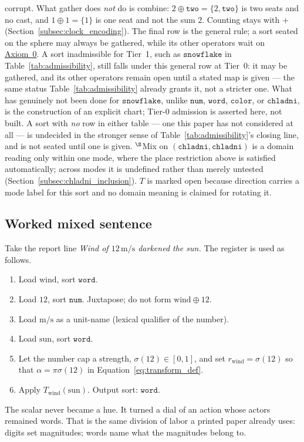 \documentclass[12pt, a4paper]{article}
\begin{document}
\begin{table}[h]
{corrupt. What gather does \emph{not} do is combine: $2\oplus
\texttt{two}=\{2,\texttt{two}\}$ is two seats and no cast, and
$1\oplus 1=\{1\}$ is one seat and not the sum $2$. Counting stays with
$+$ (Section~\ref{subsec:clock_encoding}). The final row is the
general rule; a sort seated on the sphere may always be gathered, while
its other operators wait on
\hyperref[subsec:axiom0_admissibility]{Axiom~0}. A sort inadmissible for
Tier~1, such as $\mathtt{snowflake}$ in
Table~\ref{tab:admissibility}, still falls under this general row at
Tier~0: it may be gathered, and its other operators remain open until
a stated map is given --- the same status Table~\ref{tab:admissibility}
already grants it, not a stricter one. What has genuinely not been
done for $\mathtt{snowflake}$, unlike $\mathtt{num}$, $\mathtt{word}$,
$\mathtt{color}$, or $\mathtt{chladni}$, is the construction of an
explicit chart; Tier-0 admission is asserted here, not built. A sort
with \emph{no} row in either table --- one this paper has not
considered at all --- is undecided in the stronger sense of
Table~\ref{tab:admissibility}'s closing line, and is not seated until
one is given.
$^{\S}$Mix on $(\mathtt{chladni},\mathtt{chladni})$ is a domain
reading only within one mode, where the place restriction above is
satisfied automatically; across modes it is undefined rather than
merely untested (Section~\ref{subsec:chladni_inclusion}). $T$ is
marked open because direction carries a mode label for this sort and
no domain meaning is claimed for rotating it.}
\label{tab:type_table}
\end{table}

\subsection{Worked mixed sentence}
\label{subsec:mixed_sentence}
Take the report line \emph{Wind of $12\,\mathrm{m/s}$ darkened the sun.}
The register is used as follows.

\begin{enumerate}
    \item Load $\mathrm{wind}$, sort $\mathtt{word}$.
    \item Load $12$, sort $\mathtt{num}$. Juxtapose; do not form
          $\mathrm{wind}\oplus 12$.
    \item Load $\mathrm{m/s}$ as a unit-name (lexical qualifier of the
          number).
    \item Load $\mathrm{sun}$, sort $\mathtt{word}$.
    \item Let the number cap a strength,
          $\sigma(12)\in[0,1]$, and set
          $r_{\mathrm{wind}}=\sigma(12)$ so that
          $\alpha=\pi\sigma(12)$ in Equation~\eqref{eq:transform_def}.
    \item Apply $T_{\mathrm{wind}}(\mathrm{sun})$. Output sort:
          $\mathtt{word}$.
\end{enumerate}
The scalar never became a hue. It turned a dial of an action whose
actors remained words. That is the same division of labor a printed
paper already uses: digits set magnitudes; words name what the
magnitudes belong to.
\end{document}
